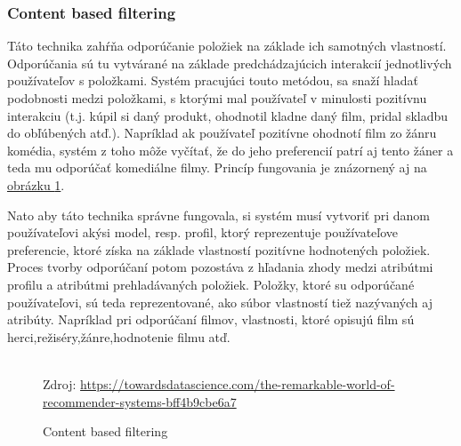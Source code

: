 \subsubsection{Content based filtering}
\label{sec:contentbased}
Táto technika zahŕňa odporúčanie položiek na základe ich samotných vlastností. Odporúčania sú tu vytvárané na základe predchádzajúcich interakcií jednotlivých používateľov s položkami. Systém pracujúci touto metódou, sa snaží hladať podobnosti medzi položkami, s ktorými mal používateľ v minulosti pozitívnu interakciu (t.j. kúpil si daný produkt, ohodnotil kladne daný film, pridal skladbu do obľúbených atď.). Napríklad ak používateľ pozitívne ohodnotí film zo žánru komédia, systém z toho môže vyčítať, že do jeho preferencií patrí aj tento žáner a teda mu odporúčať komediálne filmy. Princíp fungovania je znázornený aj na \hyperref[contentFiltering]{obrázku \ref{contentFiltering}}.

Nato aby táto technika správne fungovala, si systém musí vytvoriť pri danom používateľovi akýsi model, resp. profil, ktorý reprezentuje používateľove preferencie, ktoré získa na základe vlastností pozitívne hodnotených položiek. Proces tvorby odporúčaní potom pozostáva z hľadania zhody medzi atribútmi profilu a atribútmi prehladávaných položiek. Položky, ktoré su odporúčané používateľovi, sú teda reprezentované, ako súbor vlastností tiež nazývaných aj atribúty. Napríklad pri odporúčaní filmov, vlastnosti, ktoré opisujú film sú herci,režiséry,žánre,hodnotenie filmu atď.\\\\
\begin{figure}[!htbp]
  \centering  
  \def\stackalignment{c}
           {\scriptsize%
            Zdroj: \url{https://towardsdatascience.com/the-remarkable-world-of-recommender-systems-bff4b9cbe6a7}}
  \caption{Content based filtering}
  
  \label{contentFiltering}
\end{figure}

